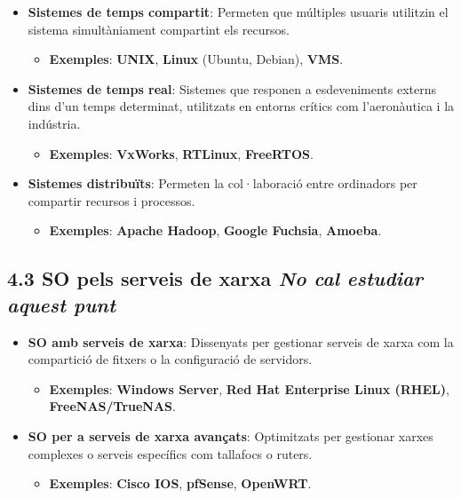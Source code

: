 \documentclass[
  a4paper,
]{article}
\providecommand{\tightlist}{%
  \setlength{\itemsep}{0pt}\setlength{\parskip}{0pt}}
\begin{document}
\begin{itemize}
\tightlist
\item
  \textbf{Sistemes de temps compartit}: Permeten que múltiples usuaris
  utilitzin el sistema simultàniament compartint els recursos.

  \begin{itemize}
  \tightlist
  \item
    \textbf{Exemples}: \textbf{UNIX}, \textbf{Linux} (Ubuntu, Debian),
    \textbf{VMS}.
  \end{itemize}
\item
  \textbf{Sistemes de temps real}: Sistemes que responen a esdeveniments
  externs dins d'un temps determinat, utilitzats en entorns crítics com
  l'aeronàutica i la indústria.

  \begin{itemize}
  \tightlist
  \item
    \textbf{Exemples}: \textbf{VxWorks}, \textbf{RTLinux},
    \textbf{FreeRTOS}.
  \end{itemize}
\item
  \textbf{Sistemes distribuïts}: Permeten la col·laboració entre
  ordinadors per compartir recursos i processos.

  \begin{itemize}
  \tightlist
  \item
    \textbf{Exemples}: \textbf{Apache Hadoop}, \textbf{Google Fuchsia},
    \textbf{Amoeba}.
  \end{itemize}
\end{itemize}

\subsection{\texorpdfstring{4.3 SO pels serveis de xarxa \emph{No cal
estudiar aquest
punt}}{4.3 SO pels serveis de xarxa No cal estudiar aquest punt}}\label{so-pels-serveis-de-xarxa-no-cal-estudiar-aquest-punt}

\begin{itemize}
\tightlist
\item
  \textbf{SO amb serveis de xarxa}: Dissenyats per gestionar serveis de
  xarxa com la compartició de fitxers o la configuració de servidors.

  \begin{itemize}
  \tightlist
  \item
    \textbf{Exemples}: \textbf{Windows Server}, \textbf{Red Hat
    Enterprise Linux (RHEL)}, \textbf{FreeNAS/TrueNAS}.
  \end{itemize}
\item
  \textbf{SO per a serveis de xarxa avançats}: Optimitzats per gestionar
  xarxes complexes o serveis específics com tallafocs o ruters.

  \begin{itemize}
  \tightlist
  \item
    \textbf{Exemples}: \textbf{Cisco IOS}, \textbf{pfSense},
    \textbf{OpenWRT}.
  \end{itemize}
\end{itemize}
\end{document}
